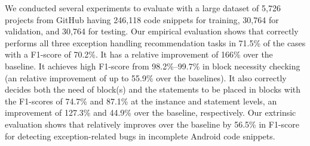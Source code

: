 We conducted several experiments to evaluate {\tool} with
a large dataset of 5,726 projects from GitHub
having 246,118 code snippets for training, 30,764 for validation,
and 30,764 for testing.
Our empirical evaluation shows that {\tool} correctly performs all
three exception handling recommendation tasks in 71.5\% of the cases
with a F1-score of 70.2\%. It has a relative improvement of 166\%
over the baseline. It achieves high F1-score from 98.2\%--99.7\% in
 block necessity checking (an relative improvement of
up to 55.9\% over the baselines). It also correctly decides both the
need of  block(s) and the statements to be placed in
 blocks with the F1-scores of 74.7\% and 87.1\% at the instance
and statement levels, an improvement of 127.3\% and 44.9\% over the
baseline, respectively. Our extrinsic evaluation shows that {\tool}
relatively improves over the baseline by 56.5\% in F1-score for detecting
exception-related bugs in incomplete Android code
snippets.



